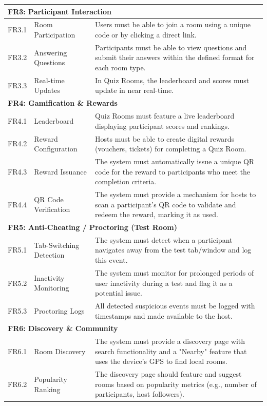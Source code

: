 \begin{longtable}{l l p{9cm}}
\multicolumn{3}{l}{\textbf{FR3: Participant Interaction}} \\
\midrule
FR3.1 & Room Participation & Users must be able to join a room using a unique code or by clicking a direct link. \\
FR3.2 & Answering Questions & Participants must be able to view questions and submit their answers within the defined format for each room type. \\
FR3.3 & Real-time Updates & In Quiz Rooms, the leaderboard and scores must update in near real-time. \\
\midrule

\multicolumn{3}{l}{\textbf{FR4: Gamification \& Rewards}} \\
\midrule
FR4.1 & Leaderboard & Quiz Rooms must feature a live leaderboard displaying participant scores and rankings. \\
FR4.2 & Reward Configuration & Hosts must be able to create digital rewards (vouchers, tickets) for completing a Quiz Room. \\
FR4.3 & Reward Issuance & The system must automatically issue a unique QR code for the reward to participants who meet the completion criteria. \\
FR4.4 & QR Code Verification & The system must provide a mechanism for hosts to scan a participant's QR code to validate and redeem the reward, marking it as used. \\
\midrule

\multicolumn{3}{l}{\textbf{FR5: Anti-Cheating / Proctoring (Test Room)}} \\
\midrule
FR5.1 & Tab-Switching Detection & The system must detect when a participant navigates away from the test tab/window and log this event. \\
FR5.2 & Inactivity Monitoring & The system must monitor for prolonged periods of user inactivity during a test and flag it as a potential issue. \\
FR5.3 & Proctoring Logs & All detected suspicious events must be logged with timestamps and made available to the host. \\
\midrule

\multicolumn{3}{l}{\textbf{FR6: Discovery \& Community}} \\
\midrule
FR6.1 & Room Discovery & The system must provide a discovery page with search functionality and a "Nearby" feature that uses the device's GPS to find local rooms. \\
FR6.2 & Popularity Ranking & The discovery page should feature and suggest rooms based on popularity metrics (e.g., number of participants, host followers). \\
\midrule


\end{longtable}
